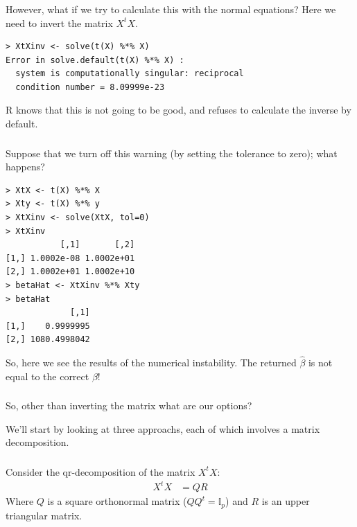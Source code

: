 \begin{frame}[fragile] \frametitle{}

However, what if we try to calculate this with the normal
equations? Here we need to invert the matrix $X^t X$.
\pause
\begin{verbatim}
> XtXinv <- solve(t(X) %*% X)
Error in solve.default(t(X) %*% X) :
  system is computationally singular: reciprocal
  condition number = 8.09999e-23
\end{verbatim}
\pause R knows that this is not going to be good, and refuses to
calculate the inverse by default.

\end{frame}

\begin{frame}[fragile] \frametitle{}

Suppose that we turn off this warning (by setting the tolerance
to zero); what happens?
\pause
\begin{verbatim}
> XtX <- t(X) %*% X
> Xty <- t(X) %*% y
> XtXinv <- solve(XtX, tol=0)
> XtXinv
           [,1]       [,2]
[1,] 1.0002e-08 1.0002e+01
[2,] 1.0002e+01 1.0002e+10
> betaHat <- XtXinv %*% Xty
> betaHat
             [,1]
[1,]    0.9999995
[2,] 1080.4998042
\end{verbatim}
\pause So, here we see the results of the numerical instability.
The returned $\widehat{\beta}$ is not equal to the correct $\beta$!

\end{frame}

\begin{frame}[fragile] \frametitle{}

So, other than inverting the matrix what are our options?

\pause We'll start by looking at three approachs, each of which
involves a matrix decomposition.

\end{frame}

\begin{frame}[fragile] \frametitle{}

Consider the qr-decomposition of the matrix $X^t X$:
\begin{align*}
X^t X &= Q R
\end{align*}
Where $Q$ is a square orthonormal matrix ($QQ^t = \mathbb{I}_p$)
and $R$ is an upper triangular matrix.

\end{frame}

